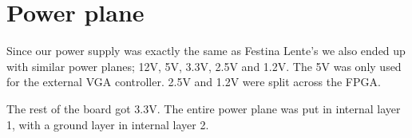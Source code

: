 \section {Power plane}



Since our power supply was exactly the same as Festina Lente's we also ended up
with similar power planes; 12V, 5V, 3.3V, 2.5V and 1.2V. The 5V was only used
for the external \ac{VGA} controller. 2.5V and 1.2V were split across the
\ac{FPGA}.

The rest of the board got 3.3V. The entire power plane was put in internal layer
1, with a ground layer in internal layer 2.

